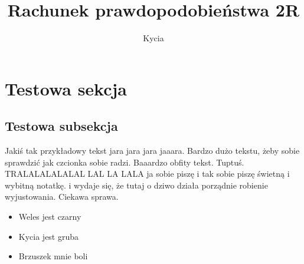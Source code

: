 \documentclass{article}
\title{Rachunek prawdopodobieństwa 2R}
\author{Kycia}
\date{}
\begin{document}
\maketitle

\section{Testowa sekcja}
\subsection{Testowa subsekcja}

{\color{blue}Jakiś tak przykładowy} tekst {\color{red}jara jara jara jaaara}. {\color{green}Bardzo dużo} tekstu, {\color{yellow}żeby sobie} sprawdzić {\color{orange}jak czcionka sobie} radzi. {\color{purple}Baaardzo obfity} tekst. Tuptuś. TRALALALALALAL LAL LA LALA ja sobie piszę i tak sobie piszę świetną i wybitną notatkę. i wydaje się, że tutaj o dziwo działa porządnie robienie wyjustowania. Ciekawa sprawa.

\begin{itemize}
  \item Weles jest czarny
  \item Kycia jest gruba
  \item Brzuszek mnie boli
\end{itemize}
\end{document}
